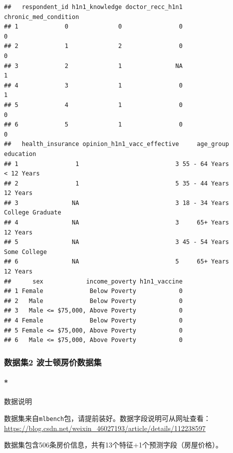 \documentclass[]{ctexbook}
\let\oldparagraph\paragraph
\renewcommand{\paragraph}[1]{\oldparagraph{#1}\mbox{}}
\newcommand{\passthrough}[1]{#1}
\begin{document}
\begin{lstlisting}
##   respondent_id h1n1_knowledge doctor_recc_h1n1 chronic_med_condition
## 1             0              0                0                     0
## 2             1              2                0                     0
## 3             2              1               NA                     1
## 4             3              1                0                     1
## 5             4              1                0                     0
## 6             5              1                0                     0
##   health_insurance opinion_h1n1_vacc_effective     age_group        education
## 1                1                           3 55 - 64 Years       < 12 Years
## 2                1                           5 35 - 44 Years         12 Years
## 3               NA                           3 18 - 34 Years College Graduate
## 4               NA                           3     65+ Years         12 Years
## 5               NA                           3 45 - 54 Years     Some College
## 6               NA                           5     65+ Years         12 Years
##      sex            income_poverty h1n1_vaccine
## 1 Female             Below Poverty            0
## 2   Male             Below Poverty            0
## 3   Male <= $75,000, Above Poverty            0
## 4 Female             Below Poverty            0
## 5 Female <= $75,000, Above Poverty            0
## 6   Male <= $75,000, Above Poverty            0
\end{lstlisting}

\hypertarget{ux6570ux636eux96c62-ux6ce2ux58ebux987fux623fux4ef7ux6570ux636eux96c6}{%
\subsubsection*{数据集2 波士顿房价数据集}\label{ux6570ux636eux96c62-ux6ce2ux58ebux987fux623fux4ef7ux6570ux636eux96c6}}


\hypertarget{ux6570ux636eux8bf4ux660e-1}{%
\paragraph*{数据说明}\label{ux6570ux636eux8bf4ux660e-1}}

数据集来自\passthrough{\lstinline!mlbench!}包，请提前装好。数据字段说明可从网址查看：\url{https://blog.csdn.net/weixin_46027193/article/details/112238597}

数据集包含506条房价信息，共有13个特征+1个预测字段（房屋价格）。
\end{document}

